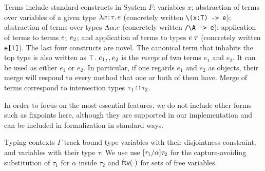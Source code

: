 
Terms include standard constructs in System
$F$: variables $ x $; abstraction of terms over variables of a given type
$\lambda x \!:\! \tau.\, e$ (concretely written \lstinline$\(x:T) -> e$);
abstraction of terms over types $\Lambda \alpha. e$ (concretely written \lstinline$/\A -> e$);
application of terms to terms $e_1 \; e_2$;
and application of terms to types $e \; \tau$ (concretely written \lstinline$e[T]$).
The last four constructs are novel.
The canonical term that inhabits the top type is also written as $\top$.
$e_1 ,, e_2$ is the \emph{merge} of two terms $e_1$ and $e_2$.
It can be used as either $ e_1 $ or $ e_2 $. In particular, if one regards $e_1$
and $e_2$ as objects, their merge will respond to every method that one or
both of them have. Merge of terms correspond to intersection types
$ \tau_1 \cap \tau_2 $.


In order to focus on the most essential features, we do not include other forms
such as fixpoints here, although they are supported in our implementation and
can be included in formalization in standard ways.

Typing contexts $ \Gamma $ track bound type variables with their disjointness
constraint, and variables with their type $\tau$. We use use $\lbrack \tau_1 / \alpha \rbrack {\tau_2}$ for the capture-avoiding substitution of $\tau_1$ for $\alpha$
inside $\tau_2$ and $\textsf{ftv}(\cdot)$ for sets of free variables.



